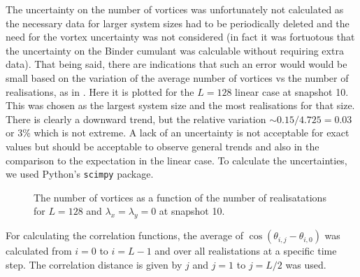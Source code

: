 The uncertainty on the number of vortices was unfortunately not calculated as the necessary data for larger system sizes had to be periodically deleted and the need for the vortex uncertainty was not considered (in fact it was fortuotous that the uncertainty on the Binder cumulant was calculable without requiring extra data). That being said, there are indications that such an error would would be small based on the variation of the average number of vortices vs the number of realisations, as in \fig{\ref{fig:vortex_run}}. Here it is plotted for the $L=128$ linear case at snapshot 10. This was chosen as the largest system size and the most realisations for that size. There is clearly a downward trend, but the relative variation $\sim 0.15/4.725=0.03$ or 3\% which is not extreme. A lack of an uncertainty is not acceptable for exact values but should be acceptable to observe general trends and also in the comparison to the expectation in the linear case. To calculate the uncertainties, we used Python's \texttt{scimpy} package.

\begin{figure}[htbp!]
\centering
\caption{The number of vortices as a function of the number of realisatations for $L=128$ and $\lambda_x = \lambda_y=0$ at snapshot 10.}
\label{fig:vortex_run}
\end{figure}

For calculating the correlation functions, the average of $\cos(\theta_{i,j} - \theta_{i,0})$ was calculated from $i=0$ to $i=L-1$ and over all realistations at a specific time step. The correlation distance is given by $j$ and $j=1$ to $j=L/2$ was used. 
 



